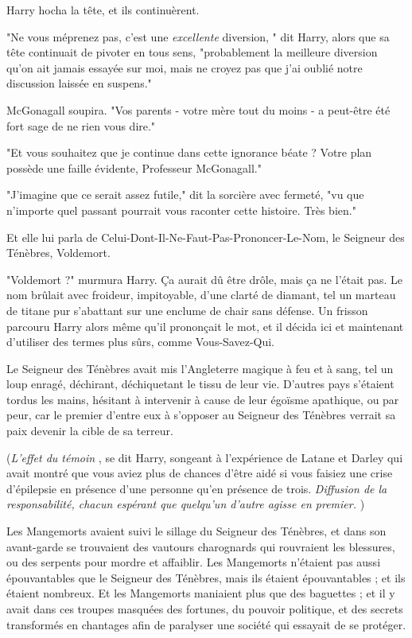 Harry hocha la tête, et ils continuèrent.

"Ne vous méprenez pas, c'est une \emph{excellente } diversion, " dit Harry, alors que sa tête continuait de pivoter en tous sens, "probablement la meilleure diversion qu'on ait jamais essayée sur moi, mais ne croyez pas que j'ai oublié notre discussion laissée en suspens."

McGonagall soupira. "Vos parents - votre mère tout du moins - a peut-être été fort sage de ne rien vous dire."

"Et vous souhaitez que je continue dans cette ignorance béate ? Votre plan possède une faille évidente, Professeur McGonagall."

"J'imagine que ce serait assez futile," dit la sorcière avec fermeté, "vu que n'importe quel passant pourrait vous raconter cette histoire. Très bien."

Et elle lui parla de Celui-Dont-Il-Ne-Faut-Pas-Prononcer-Le-Nom, le Seigneur des Ténèbres, Voldemort.

"Voldemort ?" murmura Harry. Ça aurait dû être drôle, mais ça ne l'était pas. Le nom brûlait avec froideur, impitoyable, d'une clarté de diamant, tel un marteau de titane pur s'abattant sur une enclume de chair sans défense. Un frisson parcouru Harry alors même qu'il prononçait le mot, et il décida ici et maintenant d'utiliser des termes plus sûrs, comme Vous-Savez-Qui.

Le Seigneur des Ténèbres avait mis l'Angleterre magique à feu et à sang, tel un loup enragé, déchirant, déchiquetant le tissu de leur vie. D'autres pays s'étaient tordus les mains, hésitant à intervenir à cause de leur égoïsme apathique, ou par peur, car le premier d'entre eux à s'opposer au Seigneur des Ténèbres verrait sa paix devenir la cible de sa terreur.

(\emph{L'effet du témoin} , se dit Harry, songeant à l'expérience de Latane et Darley qui avait montré que vous aviez plus de chances d'être aidé si vous faisiez une crise d'épilepsie en présence d'une personne qu'en présence de trois. \emph{Diffusion de la responsabilité, chacun espérant que quelqu'un d'autre agisse en premier.} )

Les Mangemorts avaient suivi le sillage du Seigneur des Ténèbres, et dans son avant-garde se trouvaient des vautours charognards qui rouvraient les blessures, ou des serpents pour mordre et affaiblir. Les Mangemorts n'étaient pas aussi épouvantables que le Seigneur des Ténèbres, mais ils étaient épouvantables ; et ils étaient nombreux. Et les Mangemorts maniaient plus que des baguettes ; et il y avait dans ces troupes masquées des fortunes, du pouvoir politique, et des secrets transformés en chantages afin de paralyser une société qui essayait de se protéger.

